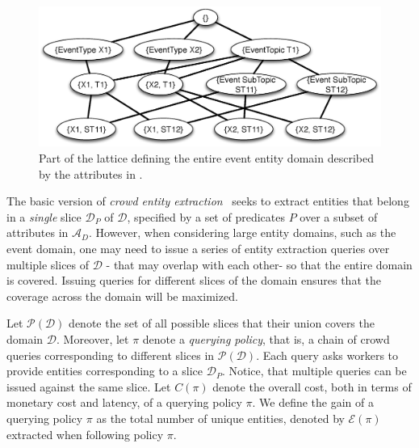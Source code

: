\documentclass{vldb}
\newcommand{\domain}{\mathcal{D}}
\newcommand{\attributes}{\mathcal{A}_D}
\newcommand{\uentities}{\mathcal{E}}
\begin{document}
\begin{figure}[h]
	\begin{center}
	\includegraphics[clip,scale=0.32]{figs/eventsExLattice.eps}
	\caption{Part of the lattice defining the entire event entity domain described by the attributes in .}
	\label{fig:eventslattice}
	\end{center}
	\vspace{-10pt}
\end{figure}

The basic version of {\em crowd entity extraction}~\cite{trushkowsky:2013} seeks to extract entities that belong in a {\em single} slice $\domain_P$ of $\domain$, specified by a set of predicates $P$ over a subset of attributes in $\attributes$. However, when considering large entity domains, such as the event domain, one may need to issue a series of entity extraction queries over multiple slices of $\domain$ - that may overlap with each other- so that the entire domain is covered. Issuing queries for different slices of the domain ensures that the coverage across the domain will be maximized. 

Let $\mathcal{P}(\domain)$ denote the set of all possible slices that their union covers the domain $\domain$. Moreover, let $\pi$ denote a {\em querying policy}, that is, a chain of crowd queries corresponding to different slices in $\mathcal{P}(\domain)$. Each query asks workers to provide entities corresponding to a slice $\domain_P$. Notice, that multiple queries can be issued against the same slice. Let $C(\pi)$ denote the overall cost, both in terms of monetary cost and latency, of a querying policy $\pi$. We define the gain of a querying policy $\pi$ as the total number of unique entities, denoted by $\uentities(\pi)$ extracted when following policy $\pi$. 
\end{document}
